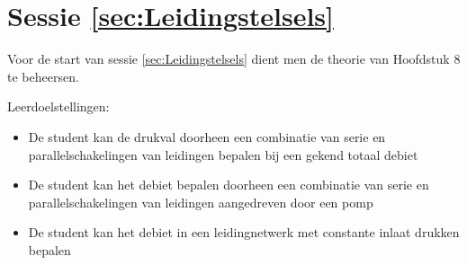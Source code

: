 	\section*{Sessie \ref{sec:Leidingstelsels}}
Voor de start van sessie \ref{sec:Leidingstelsels} dient men de theorie van Hoofdstuk 8 te beheersen.

Leerdoelstellingen:
\begin{itemize}
	\item De student kan de drukval doorheen een combinatie van serie en parallelschakelingen van leidingen bepalen bij een gekend totaal debiet
	\item De student kan het debiet bepalen doorheen een combinatie van serie en parallelschakelingen van leidingen aangedreven door een pomp
	\item De student kan het debiet in een leidingnetwerk met constante inlaat drukken bepalen
\end{itemize}
